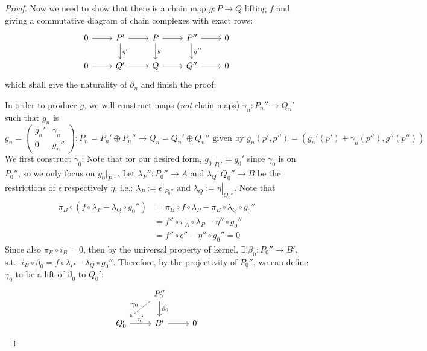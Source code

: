 \begin{proof}
    Now we need to show that there is a chain map $g: P\to Q$ lifting $f$ and giving a commutative diagram of chain complexes with exact rows:
    \[
    \begin{tikzcd}
        0\arrow[r] &P'\arrow[r] \arrow[d, "g'"] &P\arrow[r] \arrow[d, "g"] &P''\arrow[r] \arrow[d, "g''"] &0\\
        0\arrow[r] &Q' \arrow[r]&Q \arrow[r]&Q'' \arrow[r]&0
    \end{tikzcd}
    \]
    which shall give the naturality of $\partial_n$ and finish the proof:

    In order to produce $g$, we will construct maps (\textit{not} chain maps) $\gamma_n: P_n''\to Q_n'$ such that $g_n$ is
    \[
    g_n =\begin{pmatrix}
        g_n' &\gamma_n\\
        0& g_n''
    \end{pmatrix}
    :P_n= P_n' \oplus P_n'' \to Q_n= Q_n' \oplus Q_n'' \text{ given by } g_n(p',p'') = (g_n'(p')+\gamma_n(p'') ,g''(p''))
    \]
    We first construct $\gamma_0$: Note that for our desired form, $g_0|_{P_0'}=g_0'$ since $\gamma_0$ is on $P_0''$, so we only focus on $g_0|_{P_0''}$. Let $\lambda_P'': P_0'' \to A$ and $\lambda_Q: Q_0'' \to B$ be the restrictions of $\epsilon$ respectively $\eta$, i.e.: $\lambda_P:= \epsilon|_{P_0''} \text{ and } \lambda_Q:= \eta|_{Q_0''}$. Note that
    \begin{align*}
        \pi_B\circ (f\circ \lambda_P -\lambda_Q\circ g_0'')&= \pi_B \circ f\circ \lambda_P -\pi_B \circ \lambda_Q \circ g_0''\\
        &= f''\circ \pi_A \circ \lambda_P -\eta'' \circ g_0''\\
        &=f'' \circ \epsilon''- \eta''\circ g_0''=0
    \end{align*}
    Since also $\pi_B \circ i_B=0$, then by the universal property of kernel, $\exists! \beta_0:P_0'' \to B'$, s.t.: $i
    _B \circ \beta_0= f\circ \lambda_P- \lambda_Q\circ g_0''$. Therefore, by the projectivity of $P_0''$, we can define $\gamma_0$ to be a lift of $\beta_0$ to $Q_0'$:
    \[
    \begin{tikzcd}
        &P_0'' \arrow[ld, dashed, "\gamma_0"'] \arrow[d, "\beta_0"]\\
        Q_0' \arrow[r, "\eta'"] &B' \arrow[r]&0
    \end{tikzcd}
    \]


\end{proof}
